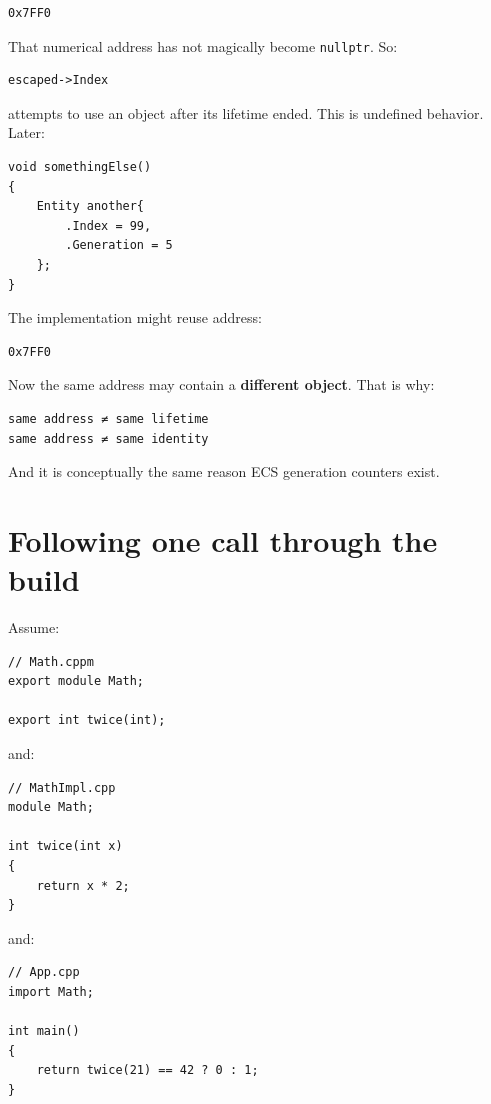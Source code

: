 \begin{verbatim}
0x7FF0
\end{verbatim}

That numerical address has not magically become \texttt{nullptr}. So:

\begin{verbatim}
escaped->Index
\end{verbatim}

attempts to use an object after its lifetime ended. This is undefined behavior. Later:

\begin{verbatim}
void somethingElse()
{
    Entity another{
        .Index = 99,
        .Generation = 5
    };
}
\end{verbatim}

The implementation might reuse address:

\begin{verbatim}
0x7FF0
\end{verbatim}

Now the same address may contain a \textbf{different object}. That is why:

\begin{verbatim}
same address ≠ same lifetime
same address ≠ same identity
\end{verbatim}

And it is conceptually the same reason ECS generation counters exist.

\section{Following one call through the build}\label{01-foundations-i-ch003-following-one-call-through-the-build}

\hypertarget{01-foundations-i-ch003-following-one-call-through-the-build}{}

Assume:

\begin{verbatim}
// Math.cppm
export module Math;

export int twice(int);
\end{verbatim}

and:

\begin{verbatim}
// MathImpl.cpp
module Math;

int twice(int x)
{
    return x * 2;
}
\end{verbatim}

and:

\begin{verbatim}
// App.cpp
import Math;

int main()
{
    return twice(21) == 42 ? 0 : 1;
}
\end{verbatim}

